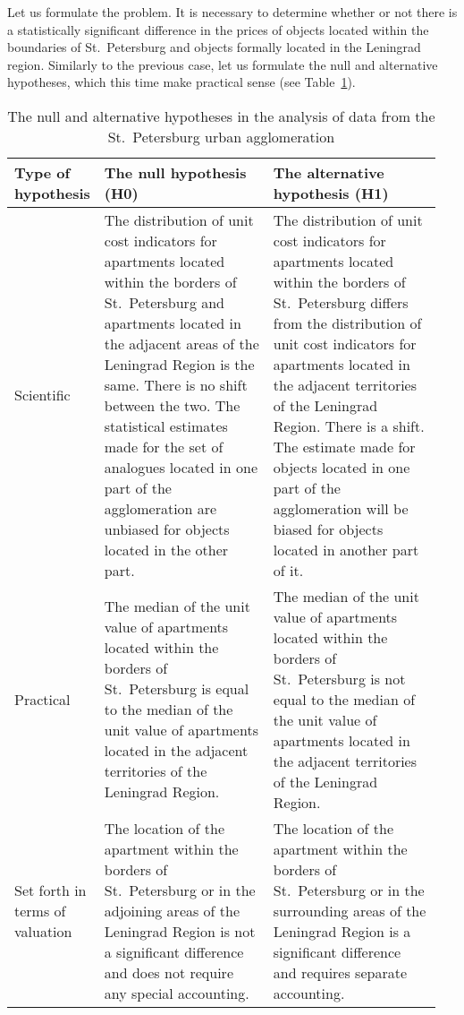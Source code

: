 \documentclass[]{scrreprt}
\begin{document}
Let us formulate the problem. It is necessary to determine whether or not there is a statistically significant difference in the prices of objects located within the boundaries of St.~Petersburg and objects formally located in the Leningrad region. Similarly to the previous case, let us formulate the null and alternative hypotheses, which this time make practical sense (see Table~\ref{tab:nul-alt-hypothesis-SPba}).
\begin{table}[htp]
	\caption{The null and alternative hypotheses in the analysis of data from the St.~Petersburg urban agglomeration}\label{tab:nul-alt-hypothesis-SPba}
	\centering
	\begin{tabularx}{\textwidth}{p{0.15\linewidth} p{0.4\linewidth} p{0.4\linewidth}} 
		\hline
		Type of hypothesis&The null hypothesis (H0)&The alternative hypothesis (H1)\\
		\hline
		Scientific&The distribution of unit cost indicators for apartments located within the borders of St.~Petersburg and apartments located in the adjacent areas of the Leningrad Region is the same. There is no shift between the two. The statistical estimates made for the set of analogues located in one part of the agglomeration are unbiased for objects located in the other part.&The distribution of unit cost indicators for apartments located within the borders of St.~Petersburg differs from the distribution of unit cost indicators for apartments located in the adjacent territories of the Leningrad Region. There is a shift. The estimate made for objects located in one part of the agglomeration will be biased for objects located in another part of it.\\
		\hline
		Practical&The median of the unit value of apartments located within the borders of St.~Petersburg is equal to the median of the unit value of apartments located in the adjacent territories of the Leningrad Region.&The median of the unit value of apartments located within the borders of St.~Petersburg is not equal to the median of the unit value of apartments located in the adjacent territories of the Leningrad Region.\\
		\hline
		Set forth in terms of valuation&The location of the apartment within the borders of St.~Petersburg or in the adjoining areas of the Leningrad Region is not a significant difference and does not require any special accounting.&The location of the apartment within the borders of St.~Petersburg or in the surrounding areas of the Leningrad Region is a significant difference and requires separate accounting.\\ \hline
	\end{tabularx}
\end{table}
\end{document}
